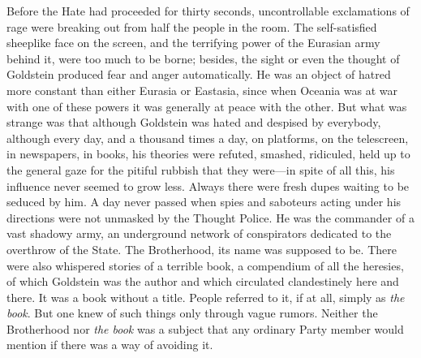 Before the Hate had proceeded for thirty seconds, uncontrollable
exclamations of rage were breaking out from half the people in the room.
The self-satisfied sheeplike face on the screen, and the terrifying
power of the Eurasian army behind it, were too much to be borne;
besides, the sight or even the thought of Goldstein produced fear and
anger automatically. He was an object of hatred more constant than
either Eurasia or Eastasia, since when Oceania was at war with one of
these powers it was generally at peace with the other. But what was
strange was that although Goldstein was hated and despised by everybody,
although every day, and a thousand times a day, on platforms, on the
telescreen, in newspapers, in books, his theories were refuted, smashed,
ridiculed, held up to the general gaze for the pitiful rubbish that they
were---in spite of all this, his influence never seemed to grow less.
Always there were fresh dupes waiting to be seduced by him. A day never
passed when spies and saboteurs acting under his directions were not
unmasked by the Thought Police. He was the commander of a vast shadowy
army, an underground network of conspirators dedicated to the overthrow
of the State. The Brotherhood, its name was supposed to be. There were
also whispered stories of a terrible book, a compendium of all the
heresies, of which Goldstein was the author and which circulated
clandestinely here and there. It was a book without a title. People
referred to it, if at all, simply as \emph{the book}. But one knew of
such things only through vague rumors. Neither the Brotherhood nor
\emph{the book} was a subject that any ordinary Party member would
mention if there was a way of avoiding it.

